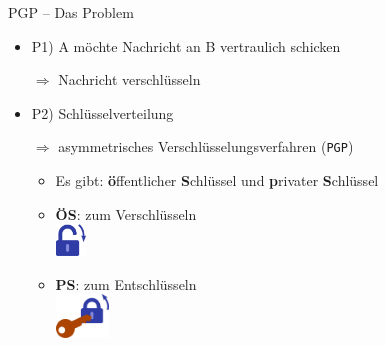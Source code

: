 \documentclass{beamer}
\begin{document}
\begin{frame}[label=bg2]{PGP – Das Problem}
  
  \begin{itemize}
   \item P1) A möchte Nachricht an B vertraulich schicken\\
   \item[$\Rightarrow$] Nachricht verschlüsseln

   \pause

   \vspace*{.5\baselineskip}

   \item P2) Schlüsselverteilung\\
   \item[$\Rightarrow$] asymmetrisches Verschlüsselungsverfahren (\texttt{PGP})
   \begin{itemize}
    \item Es gibt: \textbf{ö}ffentlicher \textbf{S}chlüssel und \textbf{p}rivater \textbf{S}chlüssel
   
    \pause

    \vspace*{.5\baselineskip}

    \item \textbf{ÖS}: zum Verschlüsseln\\
    {\vspace*{4mm}\hspace{12mm}\includegraphics[width=8mm]{img-src/padlock-lock}}
   
   
    \item \textbf{PS}: zum Entschlüsseln\\
    {\vspace*{4mm}\hspace{4mm}\includegraphics[width=14mm]{img-src/padlock-unlock-with-key}}

   \end{itemize}
  \end{itemize}


\end{frame}
\end{document}
